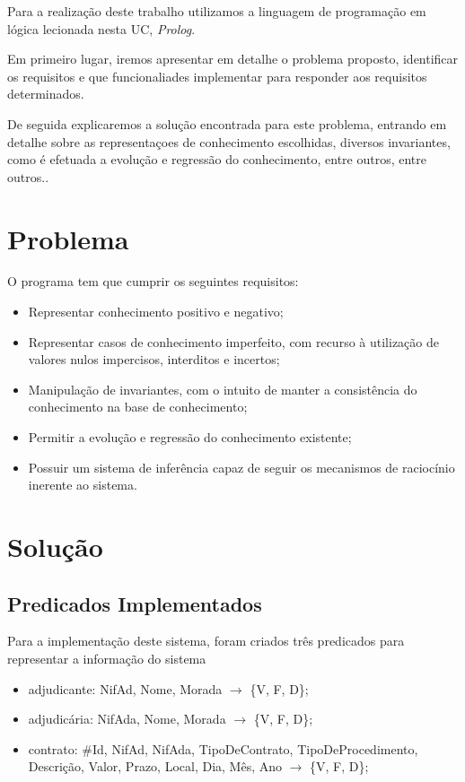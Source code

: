 \documentclass[a4paper]{report}
\begin{document}
Para a realização deste trabalho utilizamos a linguagem de programação em lógica
lecionada nesta UC, \textit{Prolog}.

Em primeiro lugar, iremos apresentar em detalhe o problema proposto, identificar
os requisitos e que funcionaliades implementar para responder aos requisitos
determinados.

De seguida explicaremos a solução encontrada para este problema, entrando em
detalhe sobre as representaçoes de conhecimento escolhidas, diversos
invariantes, como é efetuada a evolução e regressão do conhecimento, entre
outros, entre outros..

\chapter{Problema}

O programa tem que cumprir os seguintes requisitos:
\begin{itemize}
        \item Representar conhecimento positivo e negativo;
        \item Representar casos de conhecimento imperfeito, com recurso à
            utilização de valores nulos impercisos, interditos e incertos;
        \item Manipulação de invariantes, com o intuito de manter a consistência
            do conhecimento na base de conhecimento;
        \item Permitir a evolução e regressão do conhecimento existente;
        \item Possuir um sistema de inferência capaz de seguir os mecanismos de
            raciocínio inerente ao sistema.
\end{itemize}

\chapter{Solução}

\section{Predicados Implementados}

Para a implementação deste sistema, foram criados três predicados para
representar a informação do sistema
\begin{itemize}
    \item adjudicante: NifAd, Nome, Morada $\rightarrow$ \{V, F, D\};
    \item adjudicária: NifAda, Nome, Morada $\rightarrow$ \{V, F, D\};
    \item contrato: \#Id, NifAd, NifAda, TipoDeContrato,
        TipoDeProcedimento, Descrição, Valor, Prazo, Local, Dia, Mês, Ano 
        $\rightarrow$ \{V, F, D\};
\end{itemize}
\end{document}
